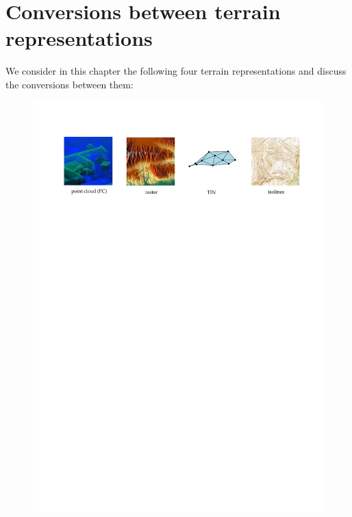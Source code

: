 

\setchapterpreamble[u]{\margintoc}
\graphicspath{{conversion/}}


\chapter{Conversions between terrain representations}%
\label{chap:conversion}

We consider in this chapter the following four terrain representations and discuss the conversions between them:
\begin{figure}[h]
  \includegraphics[width=\linewidth]{figs/reps}
\end{figure}



